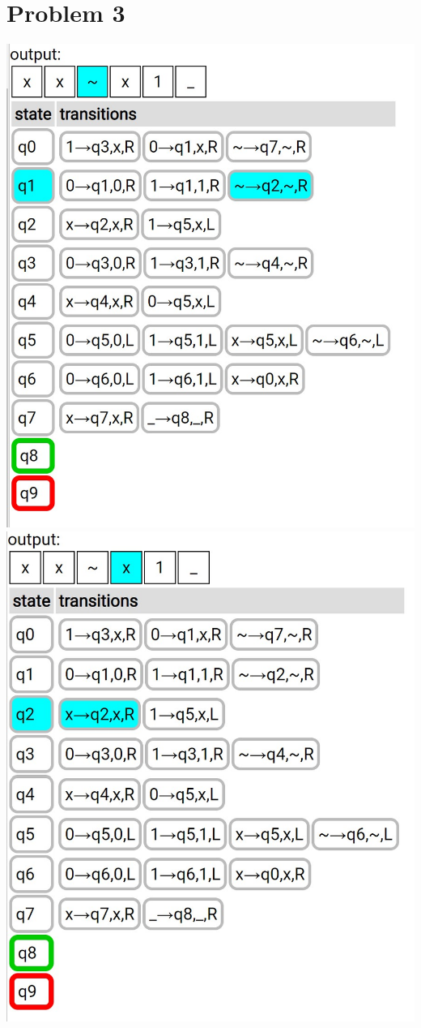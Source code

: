\documentclass{article}
\newenvironment{problem}[1]{
  \nobreak\section*{Problem #1}
}{}
\begin{document}
\begin{problem}{3}
\begin{center}
      \includegraphics[scale=0.5]{images/8.jpg}
      \includegraphics[scale=0.5]{images/9.jpg}

\end{center}
\end{problem}
\end{document}
